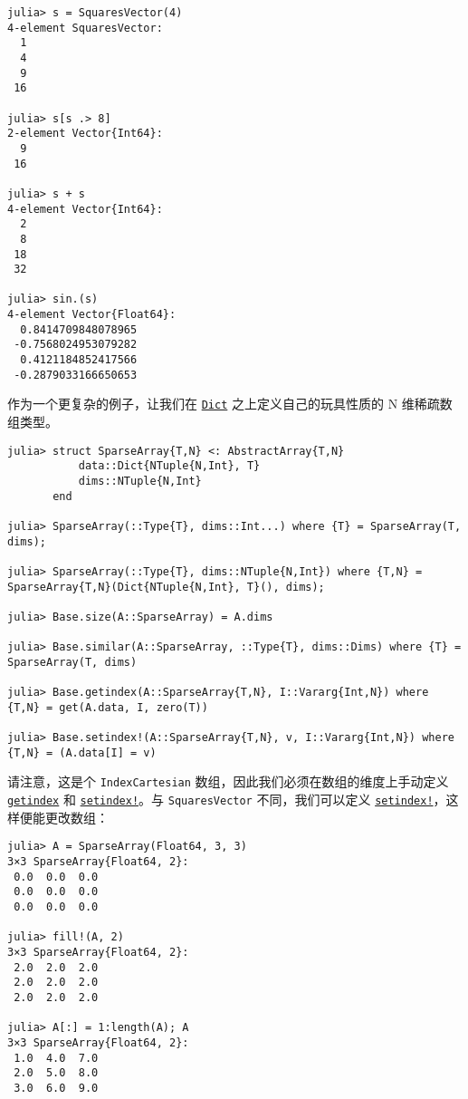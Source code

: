 \begin{verbatim}
julia> s = SquaresVector(4)
4-element SquaresVector:
  1
  4
  9
 16

julia> s[s .> 8]
2-element Vector{Int64}:
  9
 16

julia> s + s
4-element Vector{Int64}:
  2
  8
 18
 32

julia> sin.(s)
4-element Vector{Float64}:
  0.8414709848078965
 -0.7568024953079282
  0.4121184852417566
 -0.2879033166650653
\end{verbatim}



作为一个更复杂的例子，让我们在 \hyperlink{3089397136845322041}{\texttt{Dict}} 之上定义自己的玩具性质的 N 维稀疏数组类型。




\begin{verbatim}
julia> struct SparseArray{T,N} <: AbstractArray{T,N}
           data::Dict{NTuple{N,Int}, T}
           dims::NTuple{N,Int}
       end

julia> SparseArray(::Type{T}, dims::Int...) where {T} = SparseArray(T, dims);

julia> SparseArray(::Type{T}, dims::NTuple{N,Int}) where {T,N} = SparseArray{T,N}(Dict{NTuple{N,Int}, T}(), dims);

julia> Base.size(A::SparseArray) = A.dims

julia> Base.similar(A::SparseArray, ::Type{T}, dims::Dims) where {T} = SparseArray(T, dims)

julia> Base.getindex(A::SparseArray{T,N}, I::Vararg{Int,N}) where {T,N} = get(A.data, I, zero(T))

julia> Base.setindex!(A::SparseArray{T,N}, v, I::Vararg{Int,N}) where {T,N} = (A.data[I] = v)
\end{verbatim}



请注意，这是个 \texttt{IndexCartesian} 数组，因此我们必须在数组的维度上手动定义 \hyperlink{13720608614876840481}{\texttt{getindex}} 和 \hyperlink{1309244355901386657}{\texttt{setindex!}}。与 \texttt{SquaresVector} 不同，我们可以定义 \hyperlink{1309244355901386657}{\texttt{setindex!}}，这样便能更改数组：




\begin{verbatim}
julia> A = SparseArray(Float64, 3, 3)
3×3 SparseArray{Float64, 2}:
 0.0  0.0  0.0
 0.0  0.0  0.0
 0.0  0.0  0.0

julia> fill!(A, 2)
3×3 SparseArray{Float64, 2}:
 2.0  2.0  2.0
 2.0  2.0  2.0
 2.0  2.0  2.0

julia> A[:] = 1:length(A); A
3×3 SparseArray{Float64, 2}:
 1.0  4.0  7.0
 2.0  5.0  8.0
 3.0  6.0  9.0
\end{verbatim}



